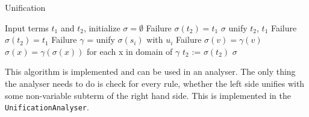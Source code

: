 \begin{algorithm}
\caption{Unification}
\label{unification}
\begin{algorithmic}[5]
\STATE Input terms $t_1$ and $t_2$, initialize $\sigma = \emptyset$
        \RETURN Failure
      \ELSE
        \RETURN $\sigma(t_2) = t_1$
      \ENDIF
    \ELSE
      \RETURN $\sigma$
    \ENDIF
  \ELSE
    \RETURN unify $t_2$, $t_1$
  \ENDIF
{}
      \RETURN Failure
    \ELSE 
      \RETURN $\sigma(t_2) = t_1$
    \ENDIF
      \RETURN Failure
    \ENDIF
      \STATE $\gamma$ = unify $\sigma(s_i)$ with $u_i$
          \RETURN Failure
        \ELSE
          \STATE $\sigma(v) = \gamma(v)$
        \ENDIF
      \ENDFOR
      \STATE $\sigma(x) = \gamma(\sigma(x))$ for each x in domain of $\gamma$
      \STATE $t_2$ := $\sigma(t_2)$
    \ENDFOR
    \RETURN $\sigma$
  \ENDIF
\ENDIF
\end{algorithmic}
\end{algorithm}

This algorithm is implemented and can be used in an analyser. The only thing the analyser needs to do is check for every rule, whether the left side unifies with some non-variable subterm of the right hand side. This is implemented in the \texttt{UnificationAnalyser}.